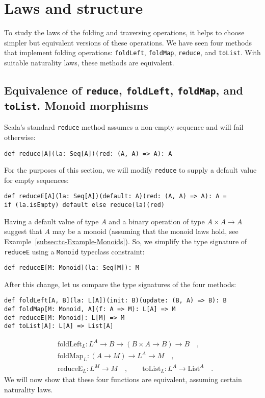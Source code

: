 \section{Laws and structure}

To study the laws of the folding and traversing operations, it helps
to choose simpler but equivalent versions of these operations. We
have seen four methods that implement folding operations: \lstinline!foldLeft!,
\lstinline!foldMap!, \lstinline!reduce!, and \lstinline!toList!.
With suitable naturality laws, these methods are equivalent.

\subsection{Equivalence of \texttt{reduce}, \texttt{foldLeft}, \texttt{foldMap},
and \texttt{toList}. Monoid morphisms\label{subsec:Equivalence-of-foldLeft,foldMap,reduce,and-toList}}

Scala\textsf{'}s standard \lstinline!reduce! method assumes a non-empty sequence
and will fail otherwise:
\begin{lstlisting}
def reduce[A](la: Seq[A])(red: (A, A) => A): A
\end{lstlisting}
For the purposes of this section, we will modify \lstinline!reduce!
to supply a default value for empty sequences:
\begin{lstlisting}
def reduceE[A](la: Seq[A])(default: A)(red: (A, A) => A): A =
if (la.isEmpty) default else reduce(la)(red)
\end{lstlisting}
Having a default value of type $A$ and a binary operation of type
$A\times A\rightarrow A$ suggest that $A$ may be a monoid (assuming
that the monoid laws hold, see Example~\ref{subsec:tc-Example-Monoids}).
So, we simplify the type signature of \lstinline!reduceE! using a
\lstinline!Monoid! typeclass constraint:
\begin{lstlisting}
def reduceE[M: Monoid](la: Seq[M]): M
\end{lstlisting}

After this change, let us compare the type signatures of the four
methods:
\begin{lstlisting}
def foldLeft[A, B](la: L[A])(init: B)(update: (B, A) => B): B
def foldMap[M: Monoid, A](f: A => M): L[A] => M
def reduceE[M: Monoid]: L[M] => M
def toList[A]: L[A] => List[A]
\end{lstlisting}
\begin{align*}
 & \text{foldLeft}_{L}:L^{A}\rightarrow B\rightarrow(B\times A\rightarrow B)\rightarrow B\quad,\\
 & \text{foldMap}_{L}:(A\rightarrow M)\rightarrow L^{A}\rightarrow M\quad,\\
 & \text{reduceE}_{L}:L^{M}\rightarrow M\quad,\quad\quad\text{toList}_{L}:L^{A}\rightarrow\text{List}^{A}\quad.
\end{align*}
We will now show that these four functions are equivalent, assuming
certain naturality laws.

